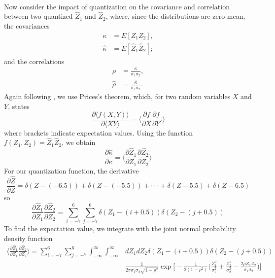 \documentclass[11pt]{article}
\begin{document}
\paragraph{}
Now consider the impact of quantization on the covariance and correlation between two quantized $\hat Z_1$ and $\hat Z_2$, where, since the distributions are zero-mean, the covariances
\begin{align}
\kappa &= E[Z_1Z_2],\\
\hat\kappa &= E[\hat Z_1\hat Z_2];
\end{align}
and the correlations
\begin{align}
\rho &= \frac{\kappa}{\sigma_1\sigma_2},\\
\hat\rho&= \frac{\hat\kappa}{\hat\sigma_1\hat\sigma_2}.
\end{align}
Again following \cite{VV}, we use Prices's theorem, which, for two random variables $X$ and $Y$, states
\begin{equation}
\frac{ \partial \langle f(X, Y)\rangle}{\partial \langle XY\rangle}=\Big\langle\frac{\partial f}{\partial X}\frac{\partial f}{\partial Y}.\Big\rangle
\end{equation}
where brackets indicate expectation values.
Using the function $f(Z_1, Z_2)=\hat Z_1 \hat Z_2$, we obtain
\begin{equation}\label{price}
\frac{\partial \hat \kappa}{\partial \kappa}=\Big\langle\frac{\partial \hat Z_1}{\partial Z_1}\frac{\partial \hat Z_2}{\partial Z_2}\Big\rangle
\end{equation}
For our quantization function, the derivative
\begin{equation}
\frac{\partial \hat Z}{\partial Z} = \delta(Z -(-6.5)) +\delta(Z -(-5.5))+\cdot\cdot\cdot+\delta(Z-5.5)+\delta(Z-6.5)
\end{equation}
so
\begin{equation}
\frac{\partial \hat Z_1}{\partial Z_1}\frac{\partial \hat Z_2}{\partial Z_2}=\sum_{i=-7}^{6}\sum_{j=-7}^{6}\delta(Z_1-(i+0.5))\delta(Z_2-(j+0.5))
\end{equation}
To find the expectation value, we integrate with the joint normal probability density function
\begin{equation}
\begin{split}
\Big\langle\frac{\partial \hat Z_1}{\partial Z_1}\frac{\partial \hat Z_2}{\partial Z_2}\Big\rangle=\sum_{i=-7}^{6}\sum_{j=-7}^{6}\int_{-\infty}^\infty\int_{-\infty}^\infty &dZ_1dZ_2\delta(Z_1-(i+0.5))\delta(Z_2-(j+0.5))\\
&\frac{1}{2\pi\sigma_{1}\sigma_{2}\sqrt{1-\rho^2}}\exp\Big[-\frac{1}{2(1-\rho^2)}\Big(\frac{Z_1^2}{\sigma_1^2}+\frac{Z_2^2}{\sigma_2^2}-\frac{2\rho Z_1Z_2}{\sigma_1\sigma_2}\Big)\Big]
\end{split}
\end{equation}
\end{document}
